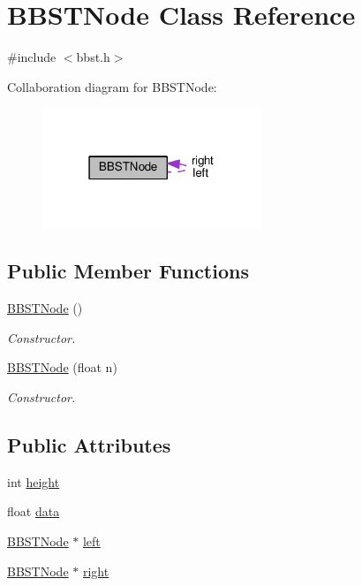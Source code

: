 \hypertarget{class_b_b_s_t_node}{}\section{B\+B\+S\+T\+Node Class Reference}
\label{class_b_b_s_t_node}


{\ttfamily \#include $<$bbst.\+h$>$}



Collaboration diagram for B\+B\+S\+T\+Node\+:
\nopagebreak
\begin{figure}[H]
\begin{center}
\leavevmode
\includegraphics[width=186pt]{class_b_b_s_t_node__coll__graph}
\end{center}
\end{figure}
\subsection*{Public Member Functions}
\begin{DoxyCompactItemize}
\item 
\hyperlink{class_b_b_s_t_node_a95c7972d8e48c1f77718a807c8253ecf}{B\+B\+S\+T\+Node} ()
\begin{DoxyCompactList}\small\item\em Constructor. \end{DoxyCompactList}\item 
\hyperlink{class_b_b_s_t_node_a28bcafd6fc932a53e2435b481783480c}{B\+B\+S\+T\+Node} (float n)
\begin{DoxyCompactList}\small\item\em Constructor. \end{DoxyCompactList}\end{DoxyCompactItemize}
\subsection*{Public Attributes}
\begin{DoxyCompactItemize}
\item 
int \hyperlink{class_b_b_s_t_node_a2347b11f5e1cdd08dc9047f5e16aa481}{height}
\item 
float \hyperlink{class_b_b_s_t_node_a701ac339cb2b6f633444e4e2be660cb2}{data}
\item 
\hyperlink{class_b_b_s_t_node}{B\+B\+S\+T\+Node} $\ast$ \hyperlink{class_b_b_s_t_node_a3ddadad752d9107c9e967b993d2666fe}{left}
\item 
\hyperlink{class_b_b_s_t_node}{B\+B\+S\+T\+Node} $\ast$ \hyperlink{class_b_b_s_t_node_ab8a78bee2fb0aa4e7e6d2feb8be28268}{right}
\end{DoxyCompactItemize}


